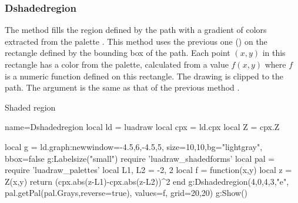 \subsubsection{Dshadedregion}

The method  fills the region defined by the path  with a gradient of colors extracted from the palette . This method uses the previous one () on the rectangle defined by the bounding box of the path. Each point $(x,y)$ in this rectangle has a color from the palette, calculated from a value $f(x,y)$ where $f$ is a numeric function defined on this rectangle. The drawing is clipped to the path. The argument  is the same as that of the previous method .

\begin{demo}{Shaded region}
\begin{luadraw}{name=Dshadedregion}
local ld = luadraw
local cpx = ld.cpx
local Z = cpx.Z

local g = ld.graph:new{window={-4.5,6,-4.5,5}, size={10,10},bg="lightgray", bbox=false}
g:Labelsize("small")
require 'luadraw_shadedforms'
local pal = require 'luadraw_palettes'
local L1, L2 = -2, 2
local f = function(x,y) 
    local z = Z(x,y)
    return (cpx.abs(z-L1)-cpx.abs(z-L2))^2
end
g:Dshadedregion({4,0,4,3,"e"}, pal.getPal(pal.Grays,{reverse=true}), {values=f, grid={20,20}})
g:Show()
\end{luadraw}
\end{demo}
